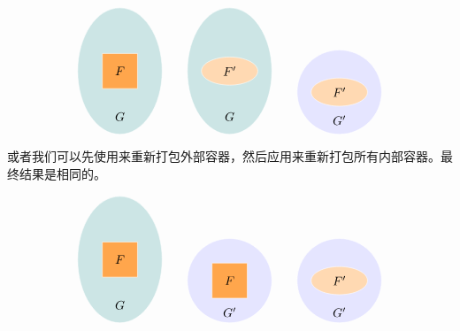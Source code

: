\documentclass[DaoFP]{subfiles}
\begin{document}
    \[
        \begin{tikzpicture}
            \filldraw[fill=blue!50!green!20, draw=white] (0, 0) ellipse (1.2 and 1.8);
            \filldraw[fill=orange!70, draw=white] (-0.5, -0.5) rectangle (0.5, 0.5);
            \node at (0, 0) {$F$};
            \node at (0, -1.3) {$G$};
        \end{tikzpicture}
        \hspace{20pt}
        \begin{tikzpicture}
            \filldraw[fill=blue!50!green!20, draw=white] (0, 0) ellipse (1.2 and 1.8);
            \filldraw[fill=orange!30, draw=white] (0, 0) ellipse (0.8 and 0.4);
            \node at (0, 0) {$F'$};
            \node at (0, -1.3) {$G$};
        \end{tikzpicture}
        \hspace{20pt}
        \begin{tikzpicture}
            \filldraw[fill=blue!10, draw=white] (0, 0) circle (1.2);
            \filldraw[fill=orange!30, draw=white] (0, 0) ellipse (0.8 and 0.4);
            \node at (0, 0) {$F'$};
            \node at (0, -0.8) {$G'$};
        \end{tikzpicture}
    \]


    或者我们可以先使用来重新打包外部容器，然后应用来重新打包所有内部容器。最终结果是相同的。

    \[
        \begin{tikzpicture}
            \filldraw[fill=blue!50!green!20, draw=white] (0, 0) ellipse (1.2 and 1.8);
            \filldraw[fill=orange!70, draw=white] (-0.5, -0.5) rectangle (0.5, 0.5);
            \node at (0, 0) {$F$};
            \node at (0, -1.3) {$G$};
        \end{tikzpicture}
        \hspace{20pt}
        \begin{tikzpicture}
            \filldraw[fill=blue!10, draw=white] (0, 0) circle (1.2);
            \filldraw[fill=orange!70, draw=white] (-0.5, -0.5) rectangle (0.5, 0.5);
            \node at (0, 0) {$F$};
            \node at (0, -0.9) {$G'$};
        \end{tikzpicture}
        \hspace{20pt}
        \begin{tikzpicture}
            \filldraw[fill=blue!10, draw=white] (0, 0) circle (1.2);
            \filldraw[fill=orange!30, draw=white] (0, 0) ellipse (0.8 and 0.4);
            \node at (0, 0) {$F'$};
            \node at (0, -0.9) {$G'$};
        \end{tikzpicture}
    \]
\end{document}
